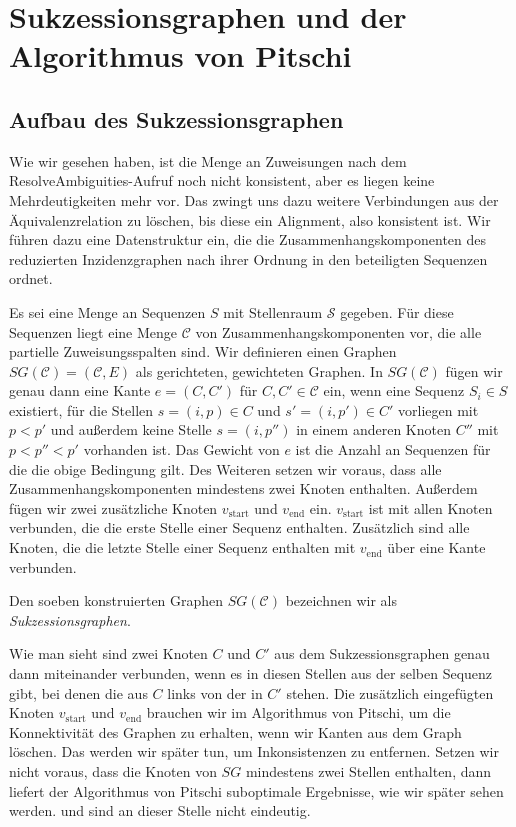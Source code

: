 \section{Sukzessionsgraphen und der Algorithmus von Pitschi}

\subsection{Aufbau des Sukzessionsgraphen}

Wie wir gesehen haben, ist die Menge an Zuweisungen nach dem \textrm{ResolveAmbiguities}-Aufruf noch nicht konsistent, aber es liegen keine Mehrdeutigkeiten mehr vor. Das zwingt uns dazu weitere Verbindungen aus der Äquivalenzrelation zu löschen, bis diese ein Alignment, also konsistent ist. Wir führen dazu eine Datenstruktur ein, die die Zusammenhangskomponenten des reduzierten Inzidenzgraphen nach ihrer Ordnung in den beteiligten Sequenzen ordnet.

Es sei eine Menge an Sequenzen $S$ mit Stellenraum $\mathcal{S}$ gegeben. Für diese Sequenzen liegt eine Menge $\mathcal{C}$ von Zusammenhangskomponenten vor, die alle partielle Zuweisungsspalten sind. Wir definieren einen Graphen $SG(\mathcal{C}) = (\mathcal{C},E)$ als gerichteten, gewichteten Graphen. In $SG(\mathcal{C})$ fügen wir genau dann eine Kante $e = (C,C')$ für $C,C' \in \mathcal{C}$ ein, wenn eine Sequenz $S_i \in S$ existiert, für die Stellen $s = (i,p) \in C$ und $s' = (i,p') \in C'$ vorliegen mit $p < p'$ und außerdem keine Stelle $s = (i,p'')$ in einem anderen Knoten $C''$ mit $p < p'' < p'$ vorhanden ist. Das Gewicht von $e$ ist die Anzahl an Sequenzen für die die obige Bedingung gilt. Des Weiteren setzen wir voraus, dass alle Zusammenhangskomponenten mindestens zwei Knoten enthalten. Außerdem fügen wir zwei zusätzliche Knoten $v_{\mathrm{start}}$ und $v_{\mathrm{end}}$ ein. $v_{\mathrm{start}}$ ist mit allen Knoten verbunden, die die erste Stelle einer Sequenz enthalten. Zusätzlich sind alle Knoten, die die letzte Stelle einer Sequenz enthalten mit $v_{\mathrm{end}}$ über eine Kante verbunden.

\begin{definition}
	Den soeben konstruierten Graphen $SG(\mathcal{C})$ bezeichnen wir als \emph{Sukzessionsgraphen}.
\end{definition}


Wie man sieht sind zwei Knoten $C$ und $C'$ aus dem Sukzessionsgraphen genau dann miteinander verbunden, wenn es in diesen Stellen aus der selben Sequenz gibt, bei denen die aus $C$ links von der in $C'$ stehen. Die zusätzlich eingefügten Knoten $v_{\mathrm{start}}$ und $v_{\mathrm{end}}$ brauchen wir im Algorithmus von Pitschi, um die Konnektivität des Graphen zu erhalten, wenn wir Kanten aus dem Graph löschen. Das werden wir später tun, um Inkonsistenzen zu entfernen. Setzen wir nicht voraus, dass die Knoten von $SG$ mindestens zwei Stellen enthalten, dann liefert der Algorithmus von Pitschi suboptimale Ergebnisse, wie wir später sehen werden. \cite{cpm10} und \cite{pdc10} sind an dieser Stelle nicht eindeutig. 

